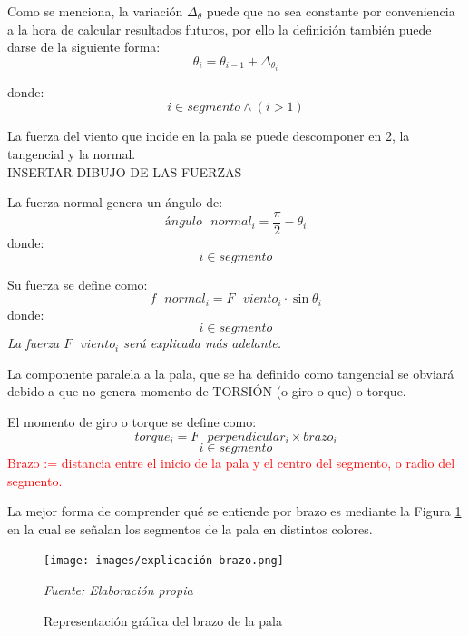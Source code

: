 \begin{definicion}
Como se menciona, la variación $\Delta_\theta$ puede que no sea constante por conveniencia a la hora de calcular resultados futuros, por ello la definición también puede darse de la siguiente forma:
$$\theta_i = \theta_{i-1} + \Delta_{\theta_{i}}$$ 

    donde:
 $$i \in segmento \wedge (i > 1)$$
\label{def:theta_nocte}
\end{definicion}


La fuerza del viento que incide en la pala se puede descomponer en 2, la tangencial y la normal. \\

 INSERTAR DIBUJO DE LAS FUERZAS \\
 
 \begin{definicion}
 La fuerza normal genera un ángulo de:
 $$ ángulo \text{ } normal_i = \dfrac{\pi}{2} - \theta_i $$
 donde:
 $$ i \in segmento$$
 \end{definicion}

 \begin{definicion}
  Su fuerza se define como:
  $$ f \text{ } normal_i = F \text{ } viento_i \cdot \sin{\theta_i}$$
   donde:
 $$ i \in segmento$$
   \textit{La fuerza $F \text{ } viento_i$ será explicada más adelante.}
  \label{def:fuerza_normal}
 \end{definicion}

 
 La componente paralela a la pala, que se ha definido como tangencial se obviará debido a que no genera momento de TORSIÓN (o giro o que) o torque. 
 
 
 
 \begin{definicion}
El momento de giro o torque se define como:
 $$ torque_i = F \text{ } perpendicular_i \times brazo_i$$
 $$ i \in segmento$$
 \label{def:torque} %
 \textcolor{red}{Brazo := distancia entre el inicio de la pala y el centro del segmento, o radio del segmento.} \\
 \end{definicion}

 La mejor forma de comprender qué se entiende por brazo es mediante la Figura \ref{fig:exp_brazo} en la cual se señalan los segmentos de la pala en distintos colores.
 
     \textbf{}
    \begin{figure}[H]
    \centering
    \texttt{[image: images/explicación brazo.png]}
    \caption{Representación gráfica del brazo de la pala}
    \label{fig:exp_brazo}
    \textit{Fuente: Elaboración propia}
\end{figure}

